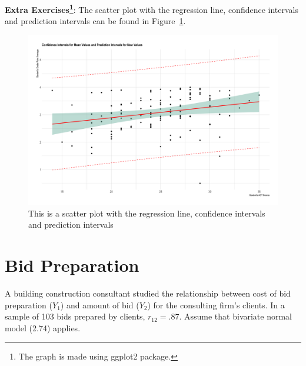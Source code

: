 \documentclass{article}
\begin{document}
\textbf{Extra Exercises\footnote{The graph is made using ggplot2 package. }}: The scatter plot with the regression line, confidence intervals and prediction intervals can be found in Figure~\ref{fig:plot1}.

\clearpage
\begin{figure}[htbp]
\begin{center}
\caption{This is a scatter plot with the regression line, confidence intervals and prediction intervals}
\includegraphics[width=150mm]{graph1.png}
\end{center}
\label{fig:plot1}
\end{figure}

\newpage
\section{Bid Preparation}
 A building construction consultant studied the relationship between cost of bid preparation (\emph{$Y_{1}$}) and amount of bid (\emph{$Y_{2}$}) for the consulting firm's clients. In a sample of 103 bids prepared by clients, $r_{12}=.87$. Assume that bivariate normal model (2.74) applies.
\end{document}
